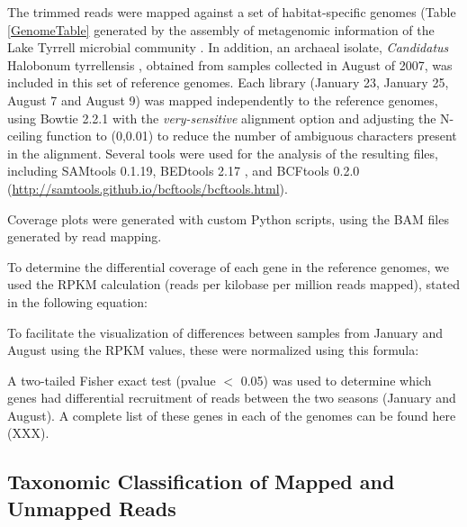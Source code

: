 The trimmed reads were mapped against a set of habitat-specific genomes (Table \ref{GenomeTable} generated by the assembly of metagenomic information of the Lake Tyrrell microbial community \cite{Narasingarao:2012kp,Podell:2013kx,Podell:2013fp}. In addition, an archaeal isolate, \textit{Candidatus} Halobonum tyrrellensis \cite{Ugalde:2013hb}, obtained from samples collected in August of 2007, was included in this set of reference genomes. Each library (January 23, January 25, August 7 and August 9) was mapped independently to the reference genomes, using Bowtie 2.2.1 \cite{Langmead:2012jh} with the \textit{very-sensitive} alignment option and adjusting the N-ceiling function to (0,0.01) to reduce the number of ambiguous characters present in the alignment. Several tools were used for the analysis of the resulting files, including SAMtools 0.1.19\cite{Li:2009ka}, BEDtools 2.17 \cite{Quinlan:2010km}, and BCFtools 0.2.0 (\url{http://samtools.github.io/bcftools/bcftools.html}).

Coverage plots were generated with custom Python scripts, using the BAM files generated by read mapping.

To determine the differential coverage of each gene in the reference genomes, we used the RPKM calculation (reads per kilobase per million reads mapped), stated in the following equation:

\begin{center}
\end{center}

To facilitate the visualization of differences between samples from January and August using the RPKM values, these were normalized using this formula:

\begin{center}
\end{center}

A two-tailed Fisher exact test (pvalue $<$ 0.05) was used to determine which genes had differential recruitment of reads between the two seasons (January and August). A complete list of these genes in each of the genomes can be found here (XXX).

\subsection{Taxonomic Classification of Mapped and Unmapped Reads}

